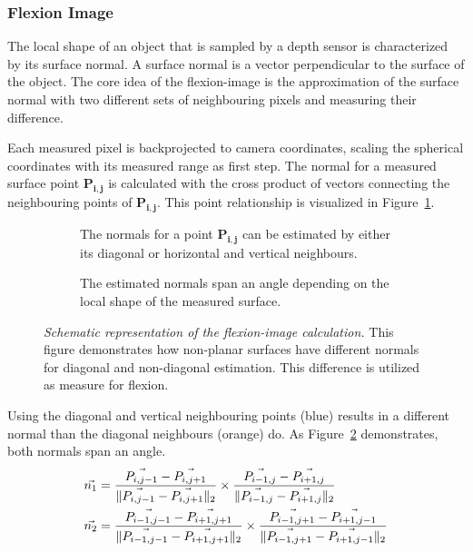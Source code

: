 \subsubsection{Flexion Image}\label{flexion-image-section}

The local shape of an object that is sampled by a depth sensor is characterized by its surface normal.
A surface normal is a vector perpendicular to the surface of the object.
The core idea of the \Gls{flexion-image} is the approximation of the surface normal with two different sets of neighbouring pixels and measuring their difference.

Each measured pixel is backprojected to camera coordinates, scaling the spherical coordinates with its measured range as first step.
The normal for a measured surface point $\mathbf{P_{i,j}}$ is calculated with the cross product of vectors connecting the neighbouring points of $\mathbf{P_{i,j}}$.
This point relationship is visualized in Figure~\ref{fig:flexion_normals_plane}.
\begin{figure}[H]
    \begin{subfigure}[t]{0.48\linewidth}
        \centering
        \scalebox{1.0}{%
        
        }
        \caption{The normals for a point $\mathbf{P_{i,j}}$ can be estimated by either its diagonal or horizontal and vertical neighbours.}\label{fig:flexion_normals_plane}
    \end{subfigure}\quad
    \begin{subfigure}[t]{0.49\linewidth}
        \centering
        \scalebox{1.0}{%
        
        }
        \caption{The estimated normals span an angle depending on the local shape of the measured surface.}\label{fig:flexion_space}
    \end{subfigure}
    \caption[Schematic representation of the \gls{flexion-image} calculation]{\emph{Schematic representation of the \gls{flexion-image} calculation.} This figure demonstrates how non-planar surfaces have different normals for diagonal and non-diagonal estimation. This difference is utilized as measure for flexion.}%
    \label{fig:flexion-image-scetched}
\end{figure}
Using the diagonal and vertical neighbouring points (blue) results in a different normal than the diagonal neighbours (orange) do.
As Figure~\ref{fig:flexion_space} demonstrates, both normals span an angle.
\begin{equation}
\begin{aligned}
    \vec{n_1} &= \frac{\vec{P_{i,j-1}} - \vec{P_{i,j+1}}}{\lVert\vec{P_{i,j-1}} - \vec{P_{i,j+1}}\rVert_{2}}
                \times \frac{\vec{P_{i-1,j}} - \vec{P_{i+1,j}}}{\lVert\vec{P_{i-1,j}} - \vec{P_{i+1,j}}\rVert_{2}} \\
    \vec{n_2} &= \frac{\vec{P_{i-1,j-1}} - \vec{P_{i+1,j+1}}}{\lVert\vec{P_{i-1,j-1}} - \vec{P_{i+1,j+1}}\rVert_{2}}
                \times \frac{\vec{P_{i-1,j+1}} - \vec{P_{i+1,j-1}}}{\lVert\vec{P_{i-1,j+1}} - \vec{P_{i+1,j-1}}\rVert_{2}}
    \label{eq:flexion_normals}
\end{aligned}
\end{equation}
